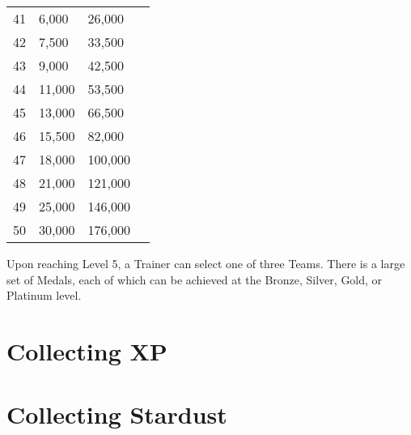 \begin{center}
\begin{tabular}{l l l l}
 41 & 6,000 & 26,000 \\
 42 & 7,500 & 33,500 \\
 43 & 9,000 & 42,500 \\
 44 & 11,000 & 53,500 \\
 45 & 13,000 & 66,500 \\
 46 & 15,500 & 82,000 \\
 47 & 18,000 & 100,000 \\
 48 & 21,000 & 121,000 \\
 49 & 25,000 & 146,000 \\
 50 & 30,000 & 176,000 \\
\end{tabular}
\end{center}

Upon reaching Level 5, a Trainer can select one of three Teams.
There is a large set of Medals, each of which can be achieved at the Bronze,
 Silver, Gold, or Platinum level.

\section{Collecting XP}

\section{Collecting Stardust}
